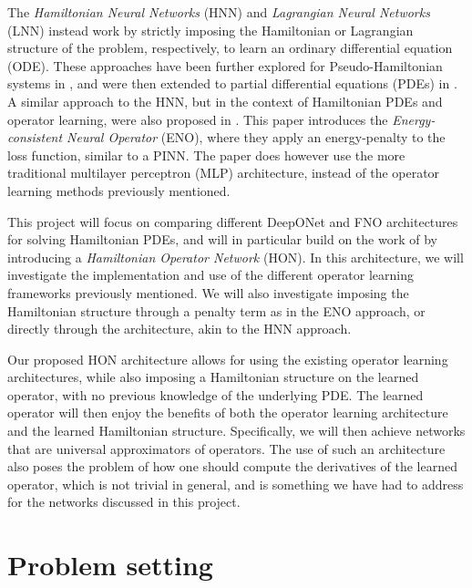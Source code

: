 The \textit{Hamiltonian Neural Networks} (HNN)  
and \textit{Lagrangian Neural Networks} (LNN)  instead work by strictly imposing the Hamiltonian or Lagrangian structure of the problem, respectively, to learn an ordinary differential equation (ODE).
These approaches have been further explored for Pseudo-Hamiltonian systems in , and were then extended to partial differential equations (PDEs) in .
A similar approach to the HNN, but in the context of Hamiltonian PDEs and operator learning, were also proposed in . This paper introduces the \textit{Energy-consistent Neural Operator} (ENO), where they apply an energy-penalty to the loss function, similar to a PINN.
The paper does however use the more traditional multilayer perceptron (MLP) architecture, instead of the operator learning methods previously mentioned.

This project will focus on comparing different DeepONet and FNO architectures for solving Hamiltonian PDEs,
and will in particular build on the work of \cite{tanakaNeuralOperatorsMeet2024} by introducing a
\textit{Hamiltonian Operator Network} (HON). In this architecture, we will investigate the implementation and use of the different operator learning frameworks previously mentioned.
We will also investigate imposing the Hamiltonian structure through a penalty term as in the ENO approach, or directly
through the architecture, akin to the HNN approach.

Our proposed HON architecture allows for using the existing operator learning architectures, while also imposing a Hamiltonian structure on the learned operator, with no previous knowledge of the underlying PDE.
The learned operator will then enjoy the benefits of both the operator learning architecture and the learned Hamiltonian structure. Specifically, we will then achieve networks that are universal approximators of operators.
The use of such an architecture also poses the problem of how one should compute the derivatives of the learned operator, which is not trivial in general, and is something we have had to address for the networks discussed in this project.

\section{Problem setting}

